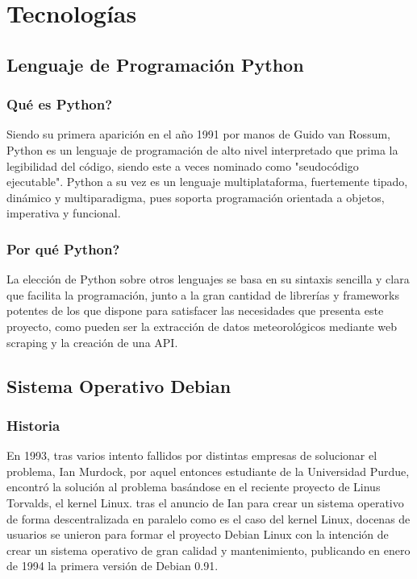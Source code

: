 \chapter[Tecnologías]{Tecnologías}
\label{Chap3}

\section{Lenguaje de Programación Python}

\subsection{Qué es Python?}
Siendo su primera aparición en el año 1991 por manos de Guido van Rossum, Python es un lenguaje de programación de alto nivel interpretado que prima la legibilidad del código, siendo este a veces nominado como "seudocódigo ejecutable". \cite{dierbach2014python}
\newline
\newline
Python a su vez es un lenguaje multiplataforma, fuertemente tipado, dinámico y multiparadigma, pues soporta programación orientada a objetos, imperativa y funcional. \cite{PyDoc} \cite{borges2014python}

\subsection{Por qué Python?}
La elección de Python sobre otros lenguajes se basa en su sintaxis sencilla y clara que facilita la programación, junto a la gran cantidad de librerías y frameworks potentes de los que dispone para satisfacer las necesidades que presenta este proyecto, como pueden ser la extracción de datos meteorológicos mediante web scraping y la creación de una API.

\newpage

\section{Sistema Operativo Debian}

\subsection{Historia}
En 1993, tras varios intento fallidos por distintas empresas de solucionar el problema, Ian Murdock, por aquel entonces estudiante de la Universidad Purdue, encontró la solución al problema basándose en el reciente proyecto de Linus Torvalds, el kernel Linux. tras el anuncio de Ian para crear un sistema operativo de forma descentralizada en paralelo como es el caso del kernel Linux, docenas de usuarios se unieron para formar el proyecto Debian Linux con la intención de crear un sistema operativo de gran calidad y mantenimiento, publicando en enero de 1994 la primera versión de Debian 0.91. \cite{krafft2005debian} \cite{DebHis}

